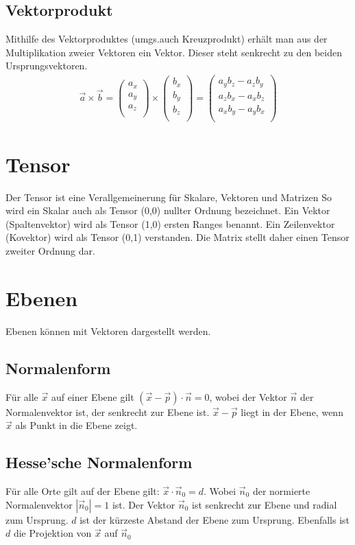 \subsection{Vektorprodukt}
Mithilfe des Vektorproduktes (umgs.auch Kreuzprodukt) erhält man aus der Multiplikation zweier Vektoren ein Vektor. Dieser steht senkrecht zu den beiden Ursprungsvektoren.
\begin{align*}
\vec{a}\times\vec{b}=
	\left(\begin{array}{c}
	a_x \\ a_y \\ a_z \\
	\end{array}\right)\times
	\left(\begin{array}{c}
	b_x \\ b_y \\ b_z \\
	\end{array}\right)=
	\left( \begin{array}{c}
	a_y b_z - a_z b_y \\ a_z b_x - a_x b_z \\ 			a_x b_y - a_y b_x \\
	\end{array} \right)
\end{align*}
\section{Tensor}
Der Tensor ist eine Verallgemeinerung für Skalare, Vektoren und Matrizen So wird ein Skalar auch als Tensor (0,0) nullter Ordnung bezeichnet. Ein Vektor (Spaltenvektor) wird als Tensor (1,0) ersten Ranges benannt. Ein Zeilenvektor (Kovektor) wird als Tensor (0,1) verstanden. Die Matrix stellt daher einen Tensor  zweiter Ordnung dar.
\section{Ebenen}
Ebenen können mit Vektoren dargestellt werden.
\subsection{Normalenform}
Für alle $\vec{x}$ auf einer Ebene gilt $\left( \vec{x}-\vec{p} \right) \cdot \vec{n}=0$, wobei der Vektor $\vec{n}$ der Normalenvektor ist, der senkrecht zur Ebene ist.  $\vec{x}-\vec{p}$ liegt in der Ebene, wenn $\vec{x}$ als Punkt in die Ebene zeigt.
\subsection{Hesse'sche Normalenform}
Für alle Orte gilt auf der Ebene gilt: $\vec{x} \cdot  \vec{n}_0=d$. Wobei $\vec{n}_0$ der normierte Normalenvektor $\left| \vec{n}_0 \right| = 1$ ist. Der Vektor $\vec{n}_0$ ist senkrecht zur Ebene und radial zum Ursprung. $d$ ist der kürzeste Abstand der Ebene zum Ursprung. Ebenfalls ist $d$ die Projektion von $\vec{x}$ auf $\vec{n}_0$